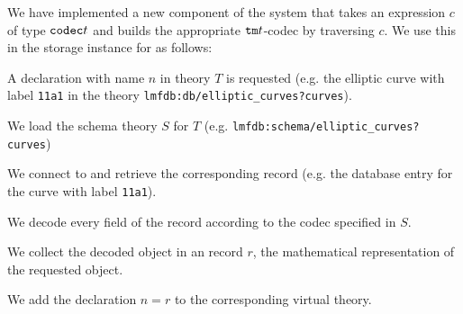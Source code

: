 We have implemented a new component of the \MMT system that takes an expression $c$ of type $\codec t$ and builds the appropriate $\tm t$-codec by traversing $c$.
We use this in the storage instance for \LMFDB as follows:
\begin{compactenum}
 \item A declaration with name $n$ in theory $T$ is requested (e.g. the elliptic curve with label \texttt{11a1} in the theory \texttt{lmfdb:db/elliptic\_curves?curves}).
 \item We load the schema theory $S$ for $T$ (e.g. \texttt{lmfdb:schema/elliptic\_curves?curves})
 \item We connect to \LMFDB and retrieve the corresponding record (e.g. the database entry for the curve with label \texttt{11a1}).
 \item We decode every field of the record according to the codec specified in $S$.
 \item We collect the decoded \MMT object in an \MMT record $r$, the mathematical representation of the requested object.
 \item We add the declaration $n=r$ to the corresponding virtual theory.
\end{compactenum}

 


